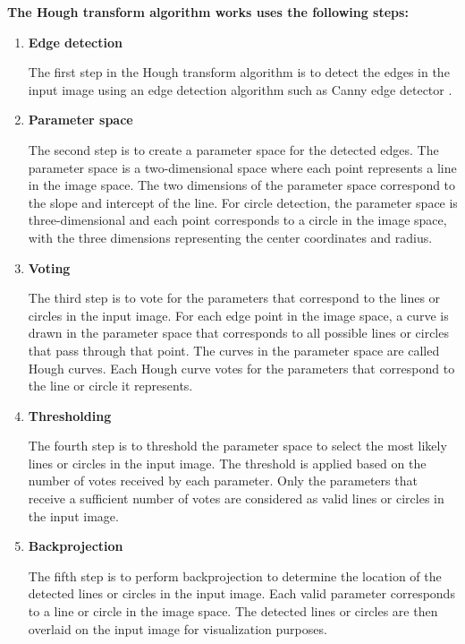     \textbf{The Hough transform algorithm works uses the following steps:}
    
    \begin{enumerate}
        
        \item \textbf{Edge detection}
        
        The first step in the Hough transform algorithm is to detect the edges in the input image using an edge detection algorithm such as Canny edge detector \cite{canny1986computational}.
        
        \item \textbf{Parameter space}
        
        The second step is to create a parameter space for the detected edges. 
        The parameter space is a two-dimensional space where each point represents a line in the image space. 
        The two dimensions of the parameter space correspond to the slope and intercept of the line. For circle detection, the parameter space is three-dimensional and each point corresponds to a circle in the image space, with the three dimensions representing the center coordinates and radius.
        
        \item \textbf{Voting}
        
        The third step is to vote for the parameters that correspond to the lines or circles in the input image. 
        For each edge point in the image space, a curve is drawn in the parameter space that corresponds to all possible lines or circles that pass through that point. 
        The curves in the parameter space are called Hough curves. Each Hough curve votes for the parameters that correspond to the line or circle it represents.
        
        \item \textbf{Thresholding}
        
        The fourth step is to threshold the parameter space to select the most likely lines or circles in the input image. 
        The threshold is applied based on the number of votes received by each parameter. 
        Only the parameters that receive a sufficient number of votes are considered as valid lines or circles in the input image.
        
        \item \textbf{Backprojection}
        
        The fifth step is to perform backprojection to determine the location of the detected lines or circles in the input image. 
        Each valid parameter corresponds to a line or circle in the image space. The detected lines or circles are then overlaid on the input image for visualization purposes.
        
    \end{enumerate}
        

